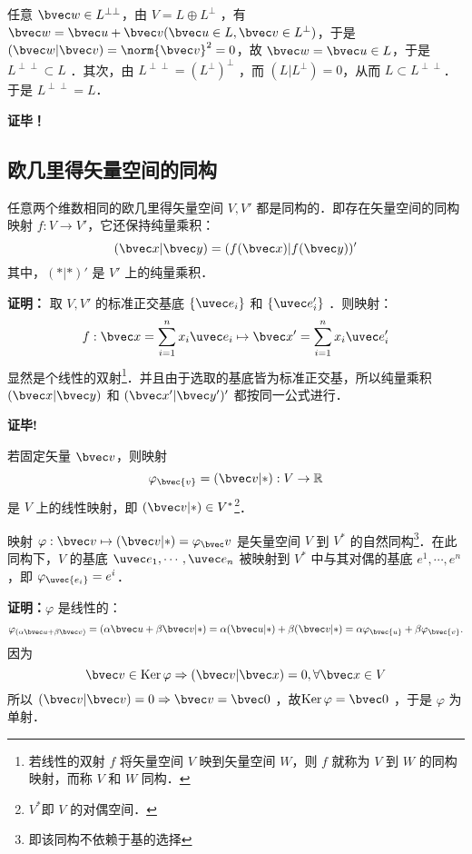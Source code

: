 任意 $\bvec w\in L^{\perp\perp}$，由 $V=L\oplus L^{\perp}$ ，有 $\bvec w=\bvec u+\bvec v(\bvec u\in L,\bvec v\in L^{\perp})$，于是 $(\bvec w|\bvec v)=\norm{\bvec v}^2=0$，故 $\bvec w=\bvec u\in L$，于是 $L^{\perp\perp}\subset L$ ．其次，由 $L^{\perp\perp}=(L^{\perp})^{\perp}$ ，而 $(L|L^{\perp})=0$，从而 $L\subset L^{\perp\perp}$．于是 $L^{\perp\perp}=L$．

\textbf{证毕！}
\subsection{欧几里得矢量空间的同构}
\begin{theorem}{}
任意两个维数相同的欧几里得矢量空间 $V,V'$ 都是同构的．即存在矢量空间的同构映射 $f:V\rightarrow V'$，它还保持纯量乘积：
\begin{equation}
(\bvec x|\bvec y)=(f(\bvec x)|f(\bvec y))'
\end{equation}
其中，$(*|*)'$ 是 $V'$ 上的纯量乘积．
\end{theorem}
\textbf{证明：} 取 $V,V'$ 的标准正交基底 $\{\uvec e_i\}$ 和 $\{\uvec e'_i\}$ ．则映射：
\begin{equation}
f:\bvec x=\sum_{i=1}^{n}x_i\uvec e_i\mapsto\bvec x'=\sum_{i=1}^{n}x_i\uvec e'_i
\end{equation}
显然是个线性的双射\footnote{若线性的双射 $f$ 将矢量空间 $V$ 映到矢量空间 $W$，则 $f$ 就称为 $V$ 到 $W$ 的同构映射，而称 $V$ 和 $W$ 同构．}．并且由于选取的基底皆为标准正交基，所以纯量乘积 $(\bvec x|\bvec y)$ 和 $(\bvec x'|\bvec y')'$ 都按同一公式进行．

\textbf{证毕!}

若固定矢量 $\bvec v$，则映射
\begin{equation}
\varphi_\bvec{v}=(\bvec v|*):V\rightarrow\mathbb{R}
\end{equation}
是 $V$ 上的线性映射，即 $(\bvec v|*)\in V^*$\footnote{$V^*$即 $V$ 的对偶空间．}．
\begin{theorem}{}\label{EVOIOG_the3}
映射 $\varphi:\bvec v\mapsto (\bvec v|*)=\varphi_\bvec v$ 是矢量空间 $V$ 到 $V^*$ 的自然同构\footnote{即该同构不依赖于基的选择}．在此同构下，$V$ 的基底 $\uvec e_1,\cdots,\uvec e_n$ 被映射到 $V^*$ 中与其对偶的基底 $e^1,\cdots,e^n$，即 $\varphi_\uvec{e_i}=e^i$．
\end{theorem}
\textbf{证明：}$\varphi$ 是线性的：
\begin{equation}
\varphi_{(\alpha\bvec u+\beta\bvec v)}=(\alpha\bvec u+\beta\bvec v|*)=\alpha(\bvec u|*)+\beta(\bvec v|*)=\alpha\varphi_\bvec{u}+\beta\varphi_\bvec{v}.
\end{equation}
因为 
\begin{equation}
\bvec v\in \mathrm{Ker}\,\varphi\Rightarrow(\bvec v|\bvec x)=0,\forall\bvec x\in V
\end{equation}
所以 $(\bvec v|\bvec v)=0\Rightarrow\bvec v=\bvec 0$ ，故$\mathrm{Ker}\,\varphi=\bvec 0$ ，于是 $\varphi$ 为单射．


